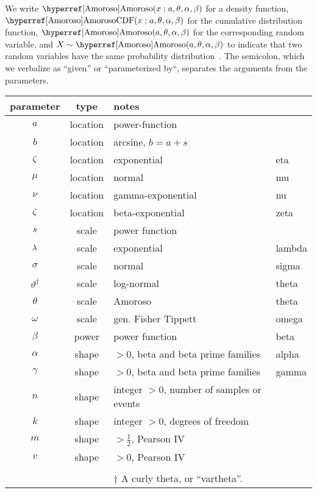 


\label{sec:notation}

We write  $\opr{Amoroso}(x\given a, \theta, \alpha, \beta)$ for a density function, $\oprr{AmorosoCDF}{Amoroso}(x\given a, \theta, \alpha, \beta)$ for the cumulative distribution function, $\opr{Amoroso}(a, \theta, \alpha, \beta)$ for the corresponding random variable,  and  $X\sim\opr{Amoroso}(a, \theta, \alpha, \beta)$ to indicate that two random variables have the same probability distribution~\cite{Gelman2004}. The semicolon, which we verbalize as ``given'' or ``parameterized by``, separates the arguments from the parameters.   

\begin{center}
\begin{tabular}{ccll}
parameter  & type &  notes\\
\hline
$a$			&location& power-function \\
$b$			&location& arcsine, $b= a+s$\\
$\zeta$		 & location &	exponential & eta\\
$\mu$		 & location & normal & mu\\
$\nu$  & location & gamma-exponential & nu\\
$\zeta$  & location & beta-exponential & zeta\\
$s$			&scale& power function\\
$\lambda$ 		 & scale & 		exponential & lambda\\
$\sigma$ 		 & scale	& normal & sigma\\
$\vartheta^\dagger$ & scale&	log-normal & theta\\
$\theta$ 		& scale & Amoroso & theta\\
$\omega$		 &scale& gen. Fisher Tippett & omega\\
$\beta$		 & power & power function	& beta \\
$\alpha$ 		& shape	& $>0$, beta and beta prime families & alpha\\
$\gamma$ 	& shape	& $>0$, beta and beta prime families & gamma\\
$n$		 	 &  shape& integer $>0$, number of samples or events \hspace{-2em} \\
$k$	 & shape	& integer $>0$, degrees of freedom\\%
$m$    		& shape & $>\tfrac{1}{2}$, Pearson IV\\
$v$			& shape & $>0$, Pearson IV\\ %
\\
&& \footnotesize{$\dagger$ A curly theta, or ``vartheta''.}
\end{tabular}
\end{center}


